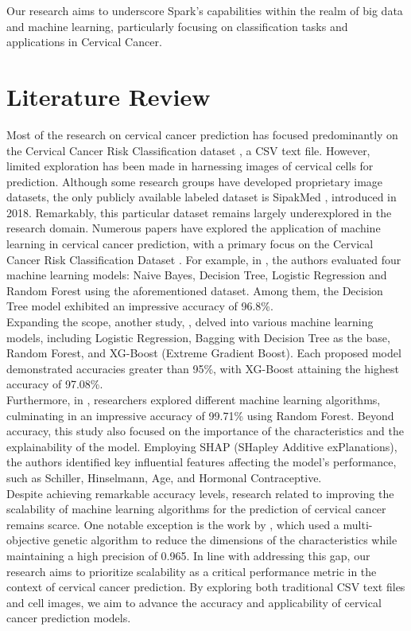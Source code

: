 \documentclass[12pt]{report}
\begin{document}

Our research aims to underscore Spark's capabilities within the realm of big data and machine learning, particularly focusing on classification tasks and applications in Cervical Cancer.

\section{Literature Review}
Most of the research on cervical cancer prediction has focused predominantly on the Cervical Cancer Risk Classification dataset \cite{kaggle}, a CSV text file. However, limited exploration has been made in harnessing images of cervical cells for prediction. Although some research groups have developed proprietary image datasets, the only publicly available labeled dataset is SipakMed \cite{Sipakmed}, introduced in 2018. Remarkably, this particular dataset remains largely underexplored in the research domain. Numerous papers have explored the application of machine learning in cervical cancer prediction, with a primary focus on the Cervical Cancer Risk Classification Dataset \cite{kaggle}. For example, in \cite{pred_ml_approach}, the authors evaluated four machine learning models: Naive Bayes, Decision Tree, Logistic Regression and Random Forest using the aforementioned dataset. Among them, the Decision Tree model exhibited an impressive accuracy of 96.8\%.\\
\indent Expanding the scope, another study, \cite{various_ml_cervical}, delved into various machine learning models, including Logistic Regression, Bagging with Decision Tree as the base, Random Forest, and XG-Boost (Extreme Gradient Boost). Each proposed model demonstrated accuracies greater than 95\%, with XG-Boost attaining the highest accuracy of 97.08\%. \\
\indent Furthermore, in \cite{model_explainablility}, researchers explored different machine learning algorithms, culminating in an impressive accuracy of 99.71\% using Random Forest. Beyond accuracy, this study also focused on the importance of the characteristics and the explainability of the model. Employing SHAP (SHapley Additive exPlanations), the authors identified key influential features affecting the model's performance, such as Schiller, Hinselmann, Age, and Hormonal Contraceptive.\\
\indent Despite achieving remarkable accuracy levels, research related to improving the scalability of machine learning algorithms for the prediction of cervical cancer remains scarce. One notable exception is the work by \cite{cervical}, which used a multi-objective genetic algorithm to reduce the dimensions of the characteristics while maintaining a high precision of 0.965. In line with addressing this gap, our research aims to prioritize scalability as a critical performance metric in the context of cervical cancer prediction. By exploring both traditional CSV text files and cell images, we aim to advance the accuracy and applicability of cervical cancer prediction models.
\end{document}
